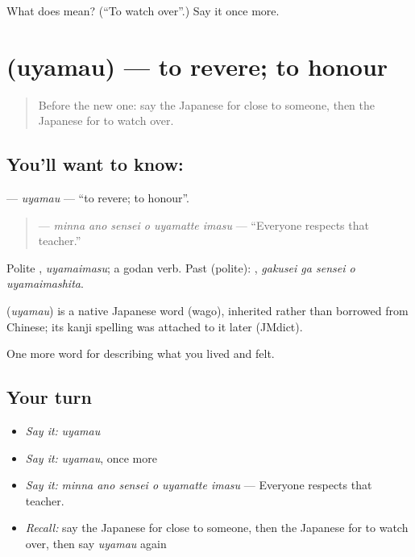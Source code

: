 \begin{tcolorbox}[breakable,colback=teal!4,colframe=teal!35!black,title={Before you move on}]
What does  mean? (\textquotedblleft{}To watch over\textquotedblright{}.) Say it once more.
\end{tcolorbox}
\section[\texorpdfstring{\ja{うやまう} (uyamau)}{うやまう (uyamau)}]{ (uyamau) — to revere; to honour}

\label{lesson:JA-C479-uyamau}



\begin{quote}
Before the new one: say the Japanese for close to someone, then the Japanese for to watch over.
\end{quote}

\subsection*{You'll want to know: }
\textbf{} — \emph{uyamau} — \textquotedblleft{}to revere; to honour\textquotedblright{}.

\begin{quote}
\textbf{   } — \emph{minna ano sensei o uyamatte imasu} — \textquotedblleft{}Everyone respects that teacher.\textquotedblright{}
\end{quote}

Polite \textbf{}, \emph{uyamaimasu}; a godan verb. Past (polite): \textbf{  }, \emph{gakusei ga sensei o uyamaimashita}.

\begin{cousinweb}
\textbf{} (\emph{uyamau}) is a native Japanese word (wago), inherited rather than borrowed from Chinese; its kanji spelling was attached to it later (JMdict).
\end{cousinweb}

\begin{grammarlens}[title={What you've built}]
One more word for describing what you lived and felt.
\end{grammarlens}

\subsection*{Your turn}
\begin{itemize}
\raggedright
  \item \emph{Say it:} \emph{uyamau}
  \item \emph{Say it:} \emph{uyamau}, once more
  \item \emph{Say it:} \emph{minna ano sensei o uyamatte imasu} — Everyone respects that teacher.
  \item \emph{Recall:} say the Japanese for close to someone, then the Japanese for to watch over, then say \emph{uyamau} again
\end{itemize}

